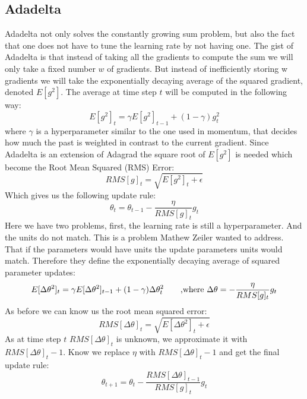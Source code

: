 \subsection{Adadelta}\label{ssec:adadelta}
Adadelta \cite{adadelta} not only solves the constantly growing sum problem, but also the fact that one does not have to tune the learning rate by not having one. The gist of Adadelta is that instead of taking all the gradients to compute the sum we will only take a fixed number $w$ of gradients. But instead of inefficiently storing w gradients we will take the exponentially decaying average of the squared gradient, denoted $E[g^{2}]$. The average at time step $t$ will be computed in the following way: 
\begin{equation}
E[g^2]_t = \gamma E[g^2]_{t-1} + (1 - \gamma) g^2_t
\end{equation}
where $\gamma$ is a hyperparameter similar to the one used in momentum, that decides how much the past is weighted in contrast to the current gradient. Since Adadelta is an extension of Adagrad the square root of $E[g^{2}]$ is needed which become the Root Mean Squared (RMS) Error:
\begin{equation}
RMS[g]_t = \sqrt{E[g^2]_t + \epsilon}
\end{equation}
Which gives us the following update rule: 
\begin{equation}
\theta_t = \theta_{t-1} - \frac{\eta}{RMS[g]_t}g_t
\end{equation}
Here we have two problems, first, the learning rate is still a hyperparameter. And the units do not match. This is a problem Mathew Zeiler wanted to address. That if the parameters would have units the update parameters units would match. 
Therefore they define the exponentially decaying average of squared parameter updates: 
\begin{equation}
E[\Delta \theta^2]_t = \gamma E[\Delta \theta^2]_{t-1} + (1 - \gamma) \Delta \theta^2_t \ \ \ \ \ \ \hfill \text{,where } \Delta \theta = - \frac{\eta}{RMS[g]_t}g_t
\end{equation}
As before we can know us the root mean squared error: 
\begin{equation}
RMS[\Delta \theta]_{t} = \sqrt{E[\Delta \theta^2]_t + \epsilon}
\end{equation}
As at time step $t$ $RMS[\Delta \theta]_{t} $ is unknown, we approximate it with $ RMS[\Delta \theta]_{t}-1$. Know we replace $\eta$ with  $ RMS[\Delta \theta]_{t}-1$ and get the final update rule: 
\begin{equation}
 \theta_{t+1} = \theta_t - \dfrac{RMS[\Delta \theta]_{t-1}}{RMS[g]_{t}} g_{t}
\end{equation}
